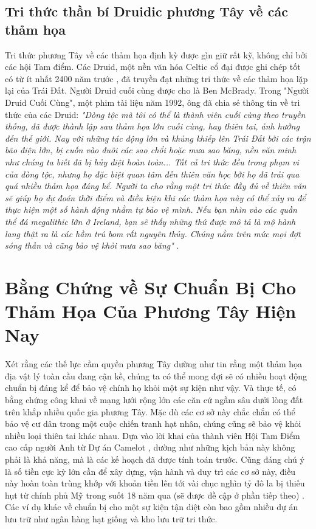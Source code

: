 \documentclass[10pt,twocolumn,letterpaper]{article}
\begin{document}
\subsection{Tri thức thần bí Druidic phương Tây về các thảm họa}

Tri thức phương Tây về các thảm họa định kỳ được gìn giữ rất kỹ, không chỉ bởi các hội Tam điểm. Các Druid, một nền văn hóa Celtic cổ đại được ghi chép tốt có từ ít nhất 2400 năm trước \cite{7}, đã truyền đạt những tri thức về các thảm họa lặp lại của Trái Đất. Người Druid cuối cùng được cho là Ben McBrady. Trong "Người Druid Cuối Cùng", một phim tài liệu năm 1992, ông đã chia sẻ thông tin về tri thức của các Druid: \textit{"Dòng tộc mà tôi có thể là thành viên cuối cùng theo truyền thống, đã được thành lập sau thảm họa lớn cuối cùng, hay thiên tai, ảnh hưởng đến thế giới. Nay với những tác động lớn và khủng khiếp lên Trái Đất bởi các trận bão điện lớn, bị cuốn vào đuôi các sao chổi hoặc mưa sao băng, nền văn minh như chúng ta biết đã bị hủy diệt hoàn toàn... Tất cả tri thức đều trong phạm vi của dòng tộc, nhưng họ đặc biệt quan tâm đến thiên văn học bởi họ đã trải qua quá nhiều thảm họa đáng kể. Người ta cho rằng một tri thức đầy đủ về thiên văn sẽ giúp họ dự đoán thời điểm và điều kiện khi các thảm họa này có thể xảy ra để thực hiện một số hành động nhằm tự bảo vệ mình. Nếu bạn nhìn vào các quần thể đá megalithic lớn ở Ireland, bạn sẽ thấy những thứ được mô tả là mộ hành lang thật ra là các hầm trú bom rất nguyên thủy. Chúng nằm trên mức mọi đợt sóng thần và cũng bảo vệ khỏi mưa sao băng"} \cite{8,9}.

\section{Bằng Chứng về Sự Chuẩn Bị Cho Thảm Họa Của Phương Tây Hiện Nay}

Xét rằng các thế lực cầm quyền phương Tây dường như tin rằng một thảm họa địa vật lý toàn cầu đang cận kề, chúng ta có thể mong đợi sẽ có nhiều hoạt động chuẩn bị đáng kể để bảo vệ chính họ khỏi một sự kiện như vậy. Và thực tế, có bằng chứng công khai về mạng lưới rộng lớn các căn cứ ngầm sâu dưới lòng đất trên khắp nhiều quốc gia phương Tây. Mặc dù các cơ sở này chắc chắn có thể bảo vệ cư dân trong một cuộc chiến tranh hạt nhân, chúng cũng sẽ bảo vệ khỏi nhiều loại thiên tai khác nhau. Dựa vào lời khai của thành viên Hội Tam Điểm cao cấp người Anh từ Dự án Camelot \cite{4,6}, dường như những kịch bản này không phải là khả năng, mà là các kế hoạch đã được tính toán trước. Cũng đáng chú ý là số tiền cực kỳ lớn cần để xây dựng, vận hành và duy trì các cơ sở này, điều này hoàn toàn trùng khớp với khoản tiền lên tới vài chục nghìn tỷ đô la bị thiếu hụt từ chính phủ Mỹ trong suốt 18 năm qua (sẽ được đề cập ở phần tiếp theo) \cite{11,12,13}. Các ví dụ khác về chuẩn bị cho một sự kiện tận diệt còn bao gồm nhiều dự án lưu trữ như ngân hàng hạt giống và kho lưu trữ tri thức.
\end{document}
